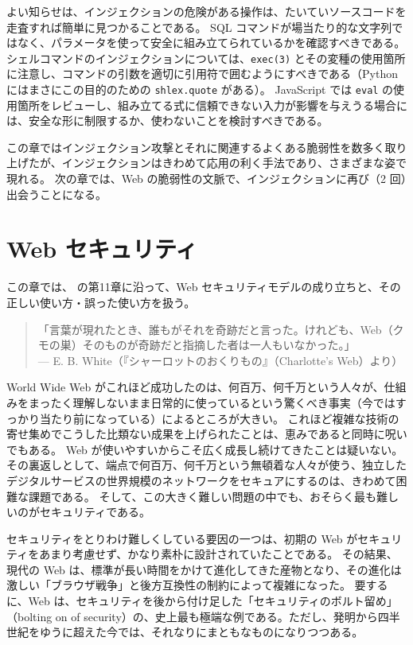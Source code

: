 \documentclass[uplatex]{jsarticle}
\begin{document}
よい知らせは、インジェクションの危険がある操作は、たいていソースコードを走査すれば簡単に見つかることである。
SQL コマンドが場当たり的な文字列ではなく、パラメータを使って安全に組み立てられているかを確認すべきである。
シェルコマンドのインジェクションについては、\texttt{exec(3)} とその変種の使用箇所に注意し、コマンドの引数を適切に引用符で囲むようにすべきである（Python にはまさにこの目的のための \texttt{shlex.quote} がある）。
JavaScript では \texttt{eval} の使用箇所をレビューし、組み立てる式に信頼できない入力が影響を与えうる場合には、安全な形に制限するか、使わないことを検討すべきである。

この章ではインジェクション攻撃とそれに関連するよくある脆弱性を数多く取り上げたが、インジェクションはきわめて応用の利く手法であり、さまざまな姿で現れる。
次の章では、Web の脆弱性の文脈で、インジェクションに再び（2 回）出会うことになる。

\newpage

\section{Web セキュリティ}

この章では、\cite{Kohnfelder2021} の第11章に沿って、Web セキュリティモデルの成り立ちと、その正しい使い方・誤った使い方を扱う。

\begin{quote}
「言葉が現れたとき、誰もがそれを奇跡だと言った。けれども、Web（クモの巣）そのものが奇跡だと指摘した者は一人もいなかった。」\\
\hfill --- E. B. White（『シャーロットのおくりもの』（Charlotte's Web）より）
\end{quote}

World Wide Web がこれほど成功したのは、何百万、何千万という人々が、仕組みをまったく理解しないまま日常的に使っているという驚くべき事実（今ではすっかり当たり前になっている）によるところが大きい。
これほど複雑な技術の寄せ集めでこうした比類ない成果を上げられたことは、恵みであると同時に呪いでもある。
Web が使いやすいからこそ広く成長し続けてきたことは疑いない。
その裏返しとして、端点で何百万、何千万という無頓着な人々が使う、独立したデジタルサービスの世界規模のネットワークをセキュアにするのは、きわめて困難な課題である。
そして、この大きく難しい問題の中でも、おそらく最も難しいのがセキュリティである。

セキュリティをとりわけ難しくしている要因の一つは、初期の Web がセキュリティをあまり考慮せず、かなり素朴に設計されていたことである。
その結果、現代の Web は、標準が長い時間をかけて進化してきた産物となり、その進化は激しい「ブラウザ戦争」と後方互換性の制約によって複雑になった。
要するに、Web は、セキュリティを後から付け足した「セキュリティのボルト留め」（bolting on of security）の、史上最も極端な例である。ただし、発明から四半世紀をゆうに超えた今では、それなりにまともなものになりつつある。
\end{document}

